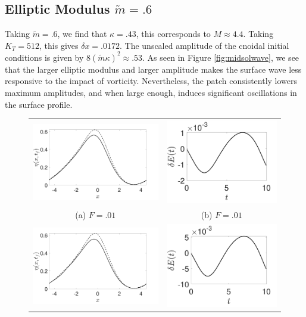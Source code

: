 \documentclass[a4paper,11pt]{article}
\begin{document}
\subsection*{Elliptic Modulus $\tilde{m}=.6$}
Taking $\tilde{m}=.6$, we find that $\kappa = .43$, this corresponds to $M \approx 4.4$.  Taking $K_{T}=512$, this gives $\delta x = .0172$.  The unscaled amplitude of the cnoidal initial conditions is given by $8(\tilde{m}\kappa)^{2}\approx .53$.  As seen in Figure \ref{fig:midsolwave}, we see that the larger elliptic modulus and larger amplitude makes the surface wave less responsive to the impact of vorticity.  Nevertheless, the patch consistently lowers maximum amplitudes, and when large enough, induces significant oscillations in the surface profile.  
\begin{figure}
\centering
\begin{tabular}{cc}
\includegraphics[width=.45\textwidth]{profiles_wm_1_modu_pt6} & \includegraphics[width=.4\textwidth]{energy_wm_1_modu_pt6}\\
(a)  $F=.01$ & (b)  $F=.01$\\
\includegraphics[width=.45\textwidth]{profiles_wm_5_modu_pt6} & \includegraphics[width=.4\textwidth]{energy_wm_5_modu_pt6}\\

\end{tabular}
\end{figure}
\end{document}
